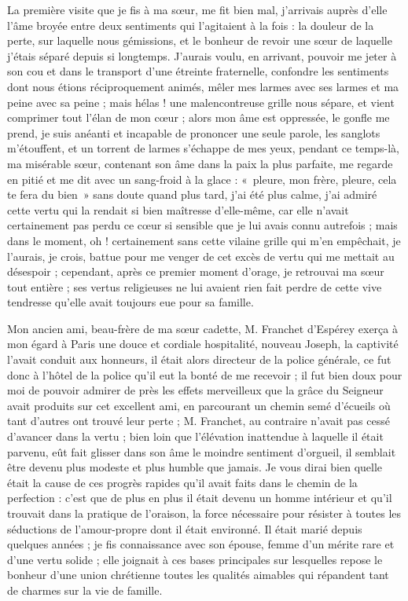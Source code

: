 \documentclass[11pt,a4paper]{report}
\begin{document}
La première visite que je fis à ma sœur, me fit bien mal, j'arrivais auprès d'elle l'âme broyée entre deux sentiments qui l'agitaient à la fois : la douleur de la perte, sur laquelle nous gémissions, et le bonheur de revoir une sœur de laquelle j'étais séparé depuis si longtemps. J'aurais voulu, en arrivant, pouvoir me jeter à son cou et dans le transport d'une étreinte fraternelle, confondre les sentiments dont nous étions réciproquement animés, mêler mes larmes avec ses larmes et ma peine avec sa peine ; mais hélas ! une malencontreuse grille nous sépare, et vient comprimer tout l'élan de mon cœur ; alors mon âme est oppressée, le gonfle me prend, je suis anéanti et incapable de prononcer une seule parole, les sanglots m'étouffent, et un torrent de larmes s'échappe de mes yeux, pendant ce temps-là, ma misérable sœur, contenant son âme dans la paix la plus parfaite, me regarde en pitié et me dit avec un sang-froid à la glace : «~pleure, mon frère, pleure, cela te fera du bien~» sans doute quand plus tard, j'ai été plus calme, j'ai admiré cette vertu qui la rendait si bien maîtresse d'elle-même, car elle n'avait certainement pas perdu ce cœur si sensible que je lui avais connu autrefois ; mais dans le moment, oh ! certainement sans cette vilaine grille qui m'en empêchait, je l'aurais, je crois, battue pour me venger de cet excès de vertu qui me mettait au désespoir ; cependant, après ce premier moment d'orage, je retrouvai ma sœur tout entière ; ses vertus religieuses ne lui avaient rien fait perdre de cette vive tendresse qu'elle avait toujours eue pour sa famille.

Mon ancien ami, beau-frère de ma sœur cadette, M. Franchet d'Espérey exerça à mon égard à Paris une douce et cordiale hospitalité, nouveau Joseph, la captivité l'avait conduit aux honneurs, il était alors directeur de la police générale, ce fut donc à l'hôtel de la police qu'il eut la bonté de me recevoir ; il fut bien doux pour moi de pouvoir admirer de près les effets merveilleux que la grâce du Seigneur avait produits sur cet excellent ami, en parcourant un chemin semé d'écueils où tant d'autres ont trouvé leur perte ; M. Franchet, au contraire n'avait pas cessé d'avancer dans la vertu ; bien loin que l'élévation inattendue à laquelle il était parvenu, eût fait glisser dans son âme le moindre sentiment d'orgueil, il semblait être devenu plus modeste et plus humble que jamais. Je vous dirai bien quelle était la cause de ces progrès rapides qu'il avait faits dans le chemin de la perfection : c'est que de plus en plus il était devenu un homme intérieur et qu'il trouvait dans la pratique de l'oraison, la force nécessaire pour résister à toutes les séductions de l'amour-propre dont il était environné. Il était marié depuis quelques années ; je fis connaissance avec son épouse, femme d'un mérite rare et d'une vertu solide ; elle joignait à ces bases principales sur lesquelles repose le bonheur d'une union chrétienne toutes les qualités aimables qui répandent tant de charmes sur la vie de famille.
\end{document}
